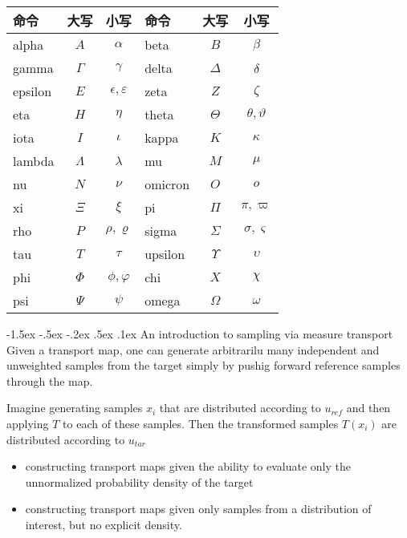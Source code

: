\documentclass[a4paper, 11pt]{article}
\makeatletter
\newcommand{\sihao}{\fontsize{14pt}{\baselineskip}\selectfont}
\renewcommand\section{\@startsection{section}{1}{\z@}%
{-1.5ex \@plus -.5ex \@minus -.2ex}%
{.5ex \@plus .1ex}%
{\normalfont\sihao\CJKfamily{hei}}}
\makeatother
\begin{document}
\begin{CJK}{UTF8}{gbsn}
 \begin{tabular}{|lcc|lcc|}
\hline
命令 & 大写 & 小写 & 命令 & 大写 & 小写 \\
\hline
  alpha & $A$ & $\alpha$ &  beta & $B$ &$\beta$  \\
  gamma & $\Gamma$ & $\gamma$  &  delta & $\Delta$ & $\delta$ \\
  epsilon & $E$ & $\epsilon,\varepsilon$ &  zeta & $Z$ & $\zeta$ \\
   eta & $H$ &$\eta$  &  theta & $\Theta$ & $\theta,\vartheta$ \\
  iota & $I$ & $\iota$ &   kappa & $K$ & $\kappa$ \\
  lambda & $\Lambda$ & $\lambda$  & mu & $M$ & $\mu$ \\
  nu & $N$ & $\nu$ & omicron & $O$ & $o$ \\
    xi & $\Xi$ & $\xi$  &   pi & $\Pi$ & $\pi,\varpi$ \\
    rho & $P$ & $\rho,\varrho$  &  sigma & $\Sigma$ & $\sigma,\varsigma$ \\
   tau & $T$ & $\tau$ &   upsilon & $\Upsilon$ & $\upsilon$ \\
  phi & $\Phi$ & $\phi,\varphi$ &  chi & $X$ & $\chi$ \\
  psi & $\Psi$ & $\psi$  &  omega & $\Omega$ &$\omega$ \\
\hline
\end{tabular}


\newpage

\section{An introduction to sampling via measure transport}
Given a transport map, one can generate arbitrarilu many
independent and unweighted samples from
the target simply by pushig forward reference
samples through the map.

Imagine generating samples $x_i$ that are
distributed according to $u_{ref}$ and then applying
$T$ to each of these samples. Then the
transformed samples $T(x_i)$ are distributed
according to $u_{tar}$


\begin{itemize}
\item constructing transport maps given the
ability to evaluate only the unnormalized
probability density of the target
\item constructing transport maps given only
samples from a distribution of interest, but
no explicit density.
\end{itemize}


\end{CJK}
\end{document}
